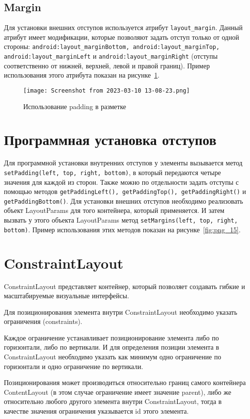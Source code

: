\subsection{Margin}
Для установки внешних отступов используется атрибут \texttt{layout\_margin}.
Данный атрибут имеет модификации, которые позволяют задать отступ
только от одной стороны: \texttt{android:layout\_marginBottom,
android:layout\_marginTop, android:layout\_marginLeft} и
\texttt{android:layout\_marginRight} (отступы соответственно от нижней,
верхней, левой и правой границ).
Пример использования этого атрибута показан на рисунке~\ref{fig:xml:margin}.

\begin{figure}[h!tp]
	\centering
	\texttt{[image: Screenshot from 2023-03-10 13-08-23.png]}
	\caption{Использование padding в разметке}
	\label{fig:xml:margin}
\end{figure}

\section{Программная установка отступов}
Для программной установки внутренних отступов у элементы вызывается
метод \texttt{setPadding(left, top, right, bottom)},
в который передаются четыре значения для каждой из сторон.
Также можно по отдельности задать отступы с помощью методов
\texttt{getPaddingLeft(), getPaddingTop(), getPaddingRight()} и
\texttt{getPaddingBottom()}.
Для установки внешних отступов необходимо реализовать объект
LayoutParams для того контейнера, который применяется.
И затем вызвать у этого объекта LayoutParams метод
\texttt{setMargins(left, top, right, bottom)}.
Пример использования этих методов показан на рисунке~\ref{fig:png_15}.


\section{ConstraintLayout}
ConstraintLayout представляет контейнер, который позволяет создавать
гибкие и масштабируемые визуальные интерфейсы.\par
Для позиционирования элемента внутри ConstraintLayout необходимо указать
ограничения (constraints).\par
Каждое ограничение устанавливает позиционирование элемента либо по
горизонтали, либо по вертикали. И для определения позиции элемента в
ConstraintLayout необходимо указать как минимум одно ограничение по
горизонтали и одно ограничение по вертикали.\par
Позиционирования может производиться относительно границ самого
контейнера ContentLayout (в этом случае ограничение имеет значение parent),
либо же относительно любого другого элемента внутри ConstraintLayout,
тогда в качестве значения ограничения указывается id этого элемента.\par

